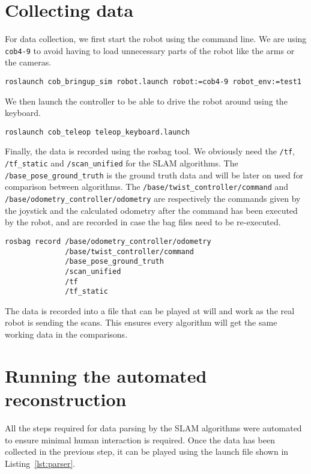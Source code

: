 \section{Collecting data} \label{sec:collecting_data}

For data collection, we first start the robot using the command line. We are using \texttt{cob4-9} to avoid having to load unnecessary parts of the robot like the arms or the cameras.

\begin{verbatim}
roslaunch cob_bringup_sim robot.launch robot:=cob4-9 robot_env:=test1
\end{verbatim}

We then launch the controller to be able to drive the robot around using the keyboard.

\begin{verbatim}
roslaunch cob_teleop teleop_keyboard.launch 
\end{verbatim}

Finally, the data is recorded using the rosbag tool. We obviously need the \texttt{/tf}, \texttt{/tf\_static} and \texttt{/scan\_unified} for the SLAM algorithms. The \texttt{/base\_pose\_ground\_truth} is the ground truth data and will be later on used for comparison between algorithms. The \texttt{/base/twist\_controller/command} and  \texttt{/base/odometry\_controller/odometry} are respectively the commands given by the joystick and the calculated odometry after the command has been executed by the robot, and are recorded in case the bag files need to be re-executed.

\begin{verbatim}
rosbag record /base/odometry_controller/odometry
              /base/twist_controller/command
              /base_pose_ground_truth
              /scan_unified
              /tf
              /tf_static
\end{verbatim}

The data is recorded into a file that can be played at will and work as the real robot is sending the scans. This ensures every algorithm will get the same working data in the comparisons.

\section{Running the automated reconstruction}

All the steps required for data parsing by the SLAM algorithms were automated to ensure minimal human interaction is required. Once the data has been collected in the previous step, it can be played using the launch file shown in Listing~\ref{lst:parser}.

